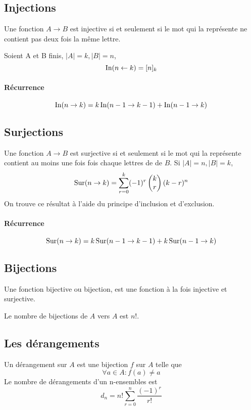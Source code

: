 \subsection{Injections}
Une fonction $A \to B$ est injective si et seulement si
le mot qui la représente ne contient pas deux fois la même lettre.

Soient A et B finis, $|A| = k, |B| = n$,
\[ \operatorname{In}(n \leftarrow k) = [n]_k \]
\paragraph{Récurrence}
\[ \operatorname{In}(n \to k) = k\operatorname{In}(n-1 \to k-1) + \operatorname{In}(n-1 \to k) \]

\subsection{Surjections}
Une fonction $A \to B$ est surjective si et seulement si le mot
qui la représente contient au moins une fois fois chaque lettres de de $B$.
Si $|A| = n, |B| = k$,
\[ \operatorname{Sur}(n \rightarrow k) = \sum_{r = 0}^k (-1)^r
  \begin{pmatrix} k\\ r \end{pmatrix} (k - r)^n \]
On trouve ce résultat à l'aide du principe d'inclusion et d'exclusion.
\paragraph{Récurrence}
\[ \operatorname{Sur}(n \to k) = k\operatorname{Sur}(n-1 \to k-1) + k\operatorname{Sur}(n-1 \to k) \]

\subsection{Bijections}
Une fonction bijective ou bijection,
est une fonction à la fois injective et surjective.

Le nombre de bijections de $A$ vers $A$ est $n!$.

\subsection{Les dérangements}
Un dérangement sur $A$ est une bijection $f$ sur $A$ telle que
\[ \forall a \in A : f(a) \neq a \]
Le nombre de dérangements d'un n-ensembles est
\[ d_n = n! \sum_{r = 0}^{n} \frac{(-1)^r}{r!} \]

